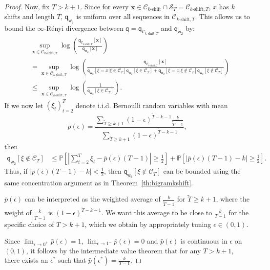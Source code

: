 \documentclass{article}
\newcommand{\sC}{\mathscr C}
\newcommand{\sS}{\mathscr S}
\newcommand{\bbP}{\mathbb{P}}
\newcommand{\bx}{{\mathbf x}}
\newcommand{\sfq}{{\mathsf q}}
\newcommand{\sfw}{{\mathsf w}}
\newcommand{\e}{\epsilon}
\begin{document}
\begin{proof}
  Now, fix $T > k + 1$. Since for every $\bx \in \sC_{\text{$k$-shift}} \cap \sS_T = \sC_{\text{$k$-shift},T}$, $x$ has $k$ shifts and length $T$,
$\sfq_{\sfw_2}$ is uniform over all sequences in $\sC_{\text{$k$-shift},T}$. This allows
us to bound the $\infty$-R\'enyi divergence between $\sfq = \sfq_{\sC_{\text{$k$-shift},T}}$ and
$\sfq_{\sfw_2}$ by:
\begin{align*}
  &\sup_{\bx \in \sC_{\text{$k$-shift},T}} \log\left(\frac{\sfq_{\sC_{\text{$k$-shift},T}}[\bx] }{ \sfq_{\sfw_2}[\bx] } \right) \\
  & = \sup_{\bx \in \sC_{\text{$k$-shift},T}} \log\left(\frac{\sfq_{\sC_{\text{$k$-shift},T}}[\bx] }{ \sfq_{\sfw_2}[\xi  = x|\xi \in \sC_T] \sfq_{\sfw_2}[\xi \in \sC_T]
  + \sfq_{\sfw_2}[\xi = x | \xi \notin \sC_T]\sfq_{\sfw_2}[\xi \notin \sC_T]} \right) \\
  & \leq \sup_{\bx \in \sC_{\text{$k$-shift},T}} \log\left(\frac{1 }{ \sfq_{\sfw_2}[\xi \in \sC_T]} \right).
\end{align*}
If we now let $(\xi_t)_{t=2}^T$ denote i.i.d. Bernoulli random variables with
mean 
  $$\bar{p}(\e) = \frac{\sum_{\tilde{T}\geq k+1} (1-\e)^{\tilde{T}-k-1} \frac{k}{\tilde{T}-1}}{\sum_{\tilde{T}\geq k+1} (1-\e)^{\tilde{T}-k-1}},$$ 
then
\begin{align*}
\sfq_{\sfw_2}[\xi \notin \sC_T] 
  &\leq \bbP\left[ \left| \sum_{t=2}^T \xi_t - \bar{p}(\e)(T-1) \right| \geq \frac{1}{2} \right] + \bbP\left[ \left|  \bar{p}(\e)(T-1) - k \right| \geq \frac{1}{2} \right]. 
\end{align*}
Thus, if $|\bar{p}(\e)(T-1) - k | < \frac{1}{2}$, then $\sfq_{\sfw_2}[\xi \notin \sC_T]$
can be bounded using the same concentration argument as in Theorem~\ref{th:bigramkshift}.

$\bar{p}(\e)$ can be interpreted as the weighted average of $\frac{k}{\tilde{T}-1}$
for $\tilde{T} \geq k +1$, where the weight of $\frac{k}{\tilde{T}-1}$ is 
$(1-\e)^{\tilde{T}-k-1}$. We want this average to be close to $\frac{k}{T-1}$
for the specific choice of $T > k +1$, which we obtain by appropriately
tuning $\e \in (0,1)$.

Since $\lim_{\e \to 0^+} \bar{p}(\e)= 1$,  $\lim_{\e \to 1^-} \bar{p}(\e) = 0$
and $\bar{p}(\e)$ is continuous in $\e$ on $(0,1)$, it follows by the intermediate
value theorem that for any $T > k+1$, there exists
an $\e^*$ such that $\bar{p}(\e^*) = \frac{k}{T-1}$. 
\end{proof}
\end{document}
